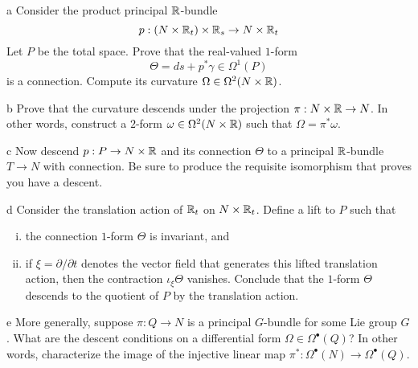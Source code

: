 \documentclass{pset}
\begin{document}
\begin{parts}
  \begin{part}{a}
    Consider the product principal $\mathbb{R}$-bundle
    \[ p : (N\times \mathbb{R}_t)\times \mathbb{R}_s \to N\times \mathbb{R}_t\]
    Let $P$ be the total space. Prove that the real-valued $1$-form
    \[\Theta = ds + p^*\gamma \in \Omega^1(P)\]
    is a connection. Compute its curvature $\Omega\in \Omega^2(N\times \mathbb{R})$.
  \end{part}

  \begin{part}{b}
    Prove that the curvature descends under the projection $\pi : N\times \mathbb{R} \to N$. In other words, construct a $2$-form $\omega\in\Omega^2(N\times \mathbb{R})$ such that $\Omega = \pi^*\omega$.
  \end{part}

  \begin{part}{c}
    Now descend $p: P \to N\times \mathbb{R}$ and its connection $\Theta$ to a principal $\mathbb{R}$-bundle $T \to N$ with connection. Be sure to produce the requisite isomorphism that proves you have a descent. %
  \end{part}

  \begin{part}{d}
    Consider the translation action of $\mathbb{R}_t$ on $N\times \mathbb{R}_t$. Define a lift to $P$ such that 
    \begin{enumerate}[(i)]
      \item the connection $1$-form $\Theta$ is invariant, and
      \item if $\xi = \partial/\partial t$ denotes the vector field that generates this lifted translation action, then the contraction $\iota_\xi \Theta$ vanishes. Conclude that the $1$-form $\Theta$ descends to the quotient of $P$ by the translation action.
    \end{enumerate}
  \end{part}

  \begin{part}{e}
    More generally, suppose $\pi : Q \to N$ is a principal $G$-bundle  for some Lie group $G$. What are the descent conditions on a differential form $\Omega\in \Omega^\bullet(Q)$? In other words, characterize the image of the injective linear map $\pi^* : \Omega^\bullet(N) \to \Omega^\bullet(Q)$.
  \end{part}
\end{parts}
\end{document}
